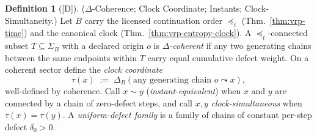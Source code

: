\documentclass[12pt,oneside]{amsbook}
\theoremstyle{plain}
\theoremstyle{definition}
\newtheorem{definition}[theorem]{Definition}
\theoremstyle{remark}
\newcommand{\status}[1]{\textup{[#1]}}
\begin{document}
\begin{definition}[\status{D}]\label{def:vrp-coherent-sector}
\textup{($\Delta$-Coherence; Clock Coordinate; Instants;
Clock-Simultaneity.)}
Let $B$ carry the licensed continuation order $\preceq_t$
(Thm.~\ref{thm:vrp-time}) and the canonical clock
(Thm.~\ref{thm:vrp-entropy-clock}).  A $\preceq_t$-connected
subset $T \subseteq \Sigma_B$ with a declared origin $o$ is
\emph{$\Delta$-coherent} if any two generating chains between the
same endpoints within $T$ carry equal cumulative defect weight.
On a coherent sector define the \emph{clock coordinate}
\[
  \tau(x) \;:=\; \Delta_B(\text{any generating chain }
  o \leadsto x),
\]
well-defined by coherence.  Call $x \sim y$
(\emph{instant-equivalent}) when $x$ and $y$ are connected by a
chain of zero-defect steps, and call $x, y$
\emph{clock-simultaneous} when $\tau(x) = \tau(y)$.  A
\emph{uniform-defect family} is a family of chains of constant
per-step defect $\delta_0 > 0$.
\end{definition}
\end{document}
